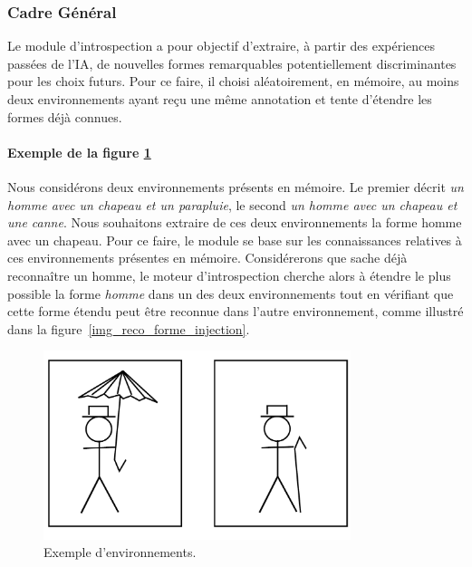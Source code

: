 \label{subsection_introspection}
\subsubsection{Cadre Général}

Le module d'introspection a pour objectif d'extraire, à partir des expériences passées de l'IA, de nouvelles formes remarquables potentiellement discriminantes pour les choix futurs. Pour ce faire, il choisi aléatoirement, en mémoire, au moins deux environnements ayant reçu une même annotation et tente d'étendre les formes déjà connues.

\paragraph{Exemple de la figure \ref{img_reco_forme_0}}
Nous considérons deux environnements présents en mémoire. Le premier décrit \emph{un homme avec un chapeau et un parapluie}, le second \emph{un homme avec un chapeau et une canne}. Nous souhaitons extraire de ces deux environnements la forme homme avec un chapeau. Pour ce faire, le module se base sur les connaissances relatives à ces environnements présentes en mémoire. Considérerons que \cogito{} sache déjà reconnaître un homme, le moteur d'introspection cherche alors à étendre le plus possible la forme \emph{homme} dans un des deux environnements tout en vérifiant que cette forme étendu peut être reconnue dans l'autre environnement, comme illustré dans la figure~\ref{img_reco_forme_injection}.

\begin{figure}[H] 
\begin{center}
\includegraphics[width=0.8\textwidth]{files/raisonneur/reconnaissance_de_formes_0} 
\end{center}
\caption{Exemple d'environnements.}
\label{img_reco_forme_0}
\end{figure}

